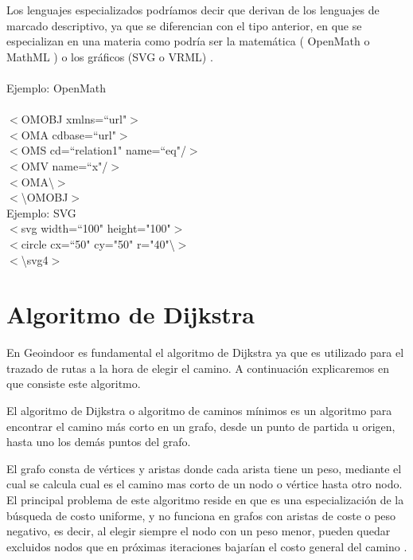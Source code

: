 Los lenguajes especializados podríamos decir que derivan de los lenguajes de marcado descriptivo, ya que se diferencian con el tipo anterior, en que se especializan en una materia como podría ser la matemática ( OpenMath o MathML ) o los gráficos (SVG o VRML) \cite{openmath} \cite{xmlusos}.
\\
\\
Ejemplo: OpenMath
\\
\\
$<$OMOBJ xmlns=``url"$>$
\\
 \tab $<$OMA cdbase=``url"$>$
 \\
    \tab\tab$<$OMS cd=``relation1" name=``eq"/$>$
    \\
   \tab\tab$<$OMV name=``x"/$>$
   \\
  \tab$<$OMA\textbackslash $>$
  \\
$<$\textbackslash OMOBJ$>$
\\
Ejemplo: SVG
\\
$<$svg width=``100" height="100"$>$
\\
  \tab$<$circle cx=``50" cy="50" r="40"\textbackslash $>$
  \\
$<$\textbackslash svg4$>$
\\

\section{Algoritmo de Dijkstra}\label{Dijkstra}
En Geoindoor es fundamental el algoritmo de Dijkstra ya que es utilizado para el trazado de rutas a la hora de elegir el camino.
A continuación explicaremos en que consiste este algoritmo.

El algoritmo de Dijkstra o algoritmo de caminos mínimos es un algoritmo para encontrar el camino más corto en un grafo, desde un punto de partida u origen, hasta uno los demás puntos del grafo.

El grafo consta de vértices y aristas donde cada arista tiene un peso, mediante el cual se calcula cual es el camino mas corto de un nodo o vértice hasta otro nodo. El principal problema de este algoritmo reside en que es una especialización de la búsqueda de costo uniforme, y no funciona en grafos con aristas de coste o peso negativo, es decir, al elegir siempre el nodo con un peso menor, pueden quedar excluidos nodos que en próximas iteraciones bajarían el costo general del camino \cite{dijkstrabib}. 
\\
\\
